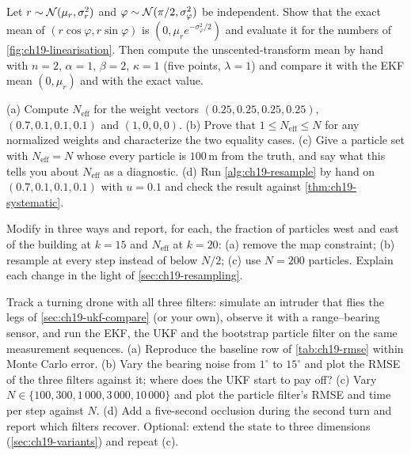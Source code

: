 \begin{exercise}[\difficulty{2}]
\label{exr:ch19-banana}
Let $r \sim \mathcal{N}(\mu_r, \sigma_r^2)$ and $\varphi \sim \mathcal{N}(\pi/2,
\sigma_\varphi^2)$ be independent. Show that the exact mean of $(r\cos
\varphi, r\sin\varphi)$ is $(0, \mu_r e^{-\sigma_\varphi^2/2})$ and evaluate
it for the numbers of \cref{fig:ch19-linearisation}. Then compute the
unscented-transform mean by hand with $n = 2$, $\alpha = 1$, $\beta = 2$,
$\kappa = 1$ (five points, $\lambda = 1$) and compare it with the EKF mean
$(0, \mu_r)$ and with the exact value.
\end{exercise}

\begin{exercise}[\difficulty{2}]
\label{exr:ch19-ess}
(a) Compute $N_{\mathrm{eff}}$ for the weight vectors $(0.25, 0.25, 0.25,
0.25)$, $(0.7, 0.1, 0.1, 0.1)$ and $(1, 0, 0, 0)$. (b) Prove that $1 \le
N_{\mathrm{eff}} \le N$ for any normalized weights and characterize the two
equality cases. (c) Give a particle set with $N_{\mathrm{eff}} = N$ whose
every particle is $100\,\mathrm{m}$ from the truth, and say what this tells
you about $N_{\mathrm{eff}}$ as a diagnostic. (d) Run
\cref{alg:ch19-resample} by hand on $(0.7, 0.1, 0.1, 0.1)$ with $u = 0.1$
and check the result against \cref{thm:ch19-systematic}.
\end{exercise}

\begin{exercise}
\label{exr:ch19-occlusion}
Modify  in three ways and report, for each, the
fraction of particles west and east of the building at $k = 15$ and
$N_{\mathrm{eff}}$ at $k = 20$: (a) remove the map constraint; (b) resample
at every step instead of below $N/2$; (c) use $N = 200$ particles. Explain
each change in the light of \cref{sec:ch19-resampling}.
\end{exercise}

\begin{exercise}
\label{exr:ch19-coding}
Track a turning drone with all three filters: simulate an intruder that
flies the legs of \cref{sec:ch19-ukf-compare} (or your own), observe it
with a range--bearing sensor, and run the EKF, the UKF and the bootstrap
particle filter on the same measurement sequences. (a) Reproduce the
baseline row of \cref{tab:ch19-rmse} within Monte Carlo error. (b) Vary the
bearing noise from $1^\circ$ to $15^\circ$ and plot the RMSE of the three
filters against it; where does the UKF start to pay off? (c) Vary $N \in
\{100, 300, 1\,000, 3\,000, 10\,000\}$ and plot the particle filter's RMSE
and time per step against $N$. (d) Add a five-second occlusion during the
second turn and report which filters recover. Optional: extend the state to
three dimensions (\cref{sec:ch19-variants}) and repeat (c).
\end{exercise}
